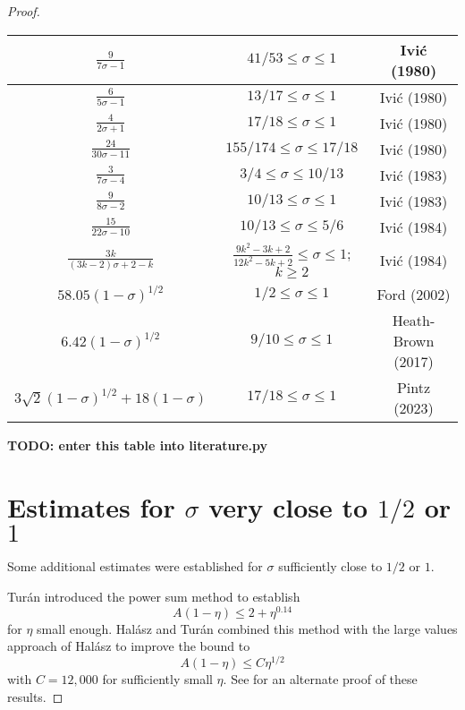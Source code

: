 \begin{proof}
\begin{table}[ht]
\begin{tabular}{|c|c|c|}
    \hline
    $\frac{9}{7\sigma-1}$ & $41/53 \leq \sigma \leq 1$ & Ivi\'c (1980) \cite{ivic_exponent_pairs} \\
    \hline
    $\frac{6}{5\sigma-1}$ & $13/17 \leq \sigma \leq 1$ & Ivi\'c (1980) \cite{ivic_exponent_pairs} \\
    \hline
    $\frac{4}{2\sigma+1}$ & $17/18 \leq \sigma \leq 1$ & Ivi\'c (1980) \cite{ivic_exponent_pairs} \\
    \hline
    $\frac{24}{30\sigma-11}$ & $155/174 \leq \sigma \leq 17/18$ & Ivi\'c (1980) \cite{ivic_exponent_pairs} \\
    \hline
    $\frac{3}{7\sigma-4}$ & $3/4 \leq \sigma \leq 10/13$ & Ivi\'c (1983) \cite{ivic_topics_1983} \\
    \hline
    $\frac{9}{8\sigma-2}$ & $10/13 \leq \sigma \leq 1$ & Ivi\'c (1983) \cite{ivic_topics_1983} \\
    \hline
    $\frac{15}{22\sigma-10}$ & $10/13 \leq \sigma \leq 5/6$ & Ivi\'c (1984) \cite{ivic_zero_1984} \\
    \hline
    $\frac{3k}{(3k-2)\sigma+2-k}$ & $\frac{9k^2 -3k + 2}{12k^2 -5k + 2} \leq \sigma \leq 1$; $k \geq 2$ & Ivi\'c (1984) \cite{ivic_zero_1984} \\
    \hline
    $58.05 (1-\sigma)^{1/2}$ & $1/2 \leq \sigma \leq 1$ & Ford (2002) \cite{FordZeta} \\
    \hline
    $6.42 (1-\sigma)^{1/2}$ & $9/10 \leq \sigma \leq 1$ & Heath-Brown (2017) \cite{heathbrown_new_2017} \\
    \hline
    $3\sqrt{2}(1-\sigma)^{1/2}+18(1-\sigma)$ & $17/18 \leq \sigma \leq 1$ & Pintz (2023) \cite{pintz_density_2023}\\
    \hline
    \end{tabular}
    \label{zero_density_historical}
    \end{table}

{\bf TODO: enter this table into literature.py}

\section{Estimates for \texorpdfstring{$\sigma$}{sigma} very close to \texorpdfstring{$1/2$}{1/2} or \texorpdfstring{$1$}{1}}

Some additional estimates were established for $\sigma$ sufficiently close to $1/2$ or $1$.

Tur\'an \cite{turan} introduced the power sum method to establish
$$ A(1-\eta) \leq 2 + \eta^{0.14}$$
for $\eta$ small enough. Hal\'asz and Tur\'an \cite{halasz_distribution_1969} combined this method with the large values approach of Hal\'asz \cite{halasz_1968} to improve the bound to
\begin{equation}\label{a-eta}
  A(1-\eta) \leq C \eta^{1/2}
\end{equation}
with $C = 12,000$ for sufficiently small $\eta$.  See \cite{pintz_2022} for an alternate proof of these results.


\end{proof}

